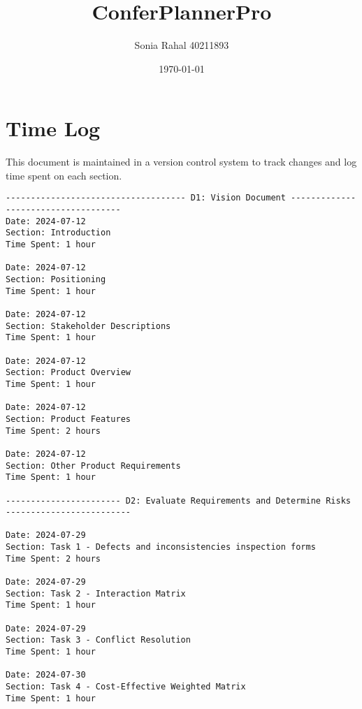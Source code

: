 \documentclass{article}
\begin{document}
\title{ConferPlannerPro}
\author{Sonia Rahal 40211893}
\date{\today}
\maketitle

\section{Time Log}
This document is maintained in a version control system to track changes and log time spent on each section.
\begin{verbatim}
------------------------------------ D1: Vision Document ------------------------------------
Date: 2024-07-12
Section: Introduction
Time Spent: 1 hour

Date: 2024-07-12
Section: Positioning
Time Spent: 1 hour

Date: 2024-07-12
Section: Stakeholder Descriptions
Time Spent: 1 hour

Date: 2024-07-12
Section: Product Overview
Time Spent: 1 hour

Date: 2024-07-12
Section: Product Features
Time Spent: 2 hours

Date: 2024-07-12
Section: Other Product Requirements
Time Spent: 1 hour

----------------------- D2: Evaluate Requirements and Determine Risks -------------------------

Date: 2024-07-29
Section: Task 1 - Defects and inconsistencies inspection forms
Time Spent: 2 hours

Date: 2024-07-29
Section: Task 2 - Interaction Matrix
Time Spent: 1 hour

Date: 2024-07-29
Section: Task 3 - Conflict Resolution
Time Spent: 1 hour

Date: 2024-07-30
Section: Task 4 - Cost-Effective Weighted Matrix
Time Spent: 1 hour

\end{verbatim}

\end{document}
